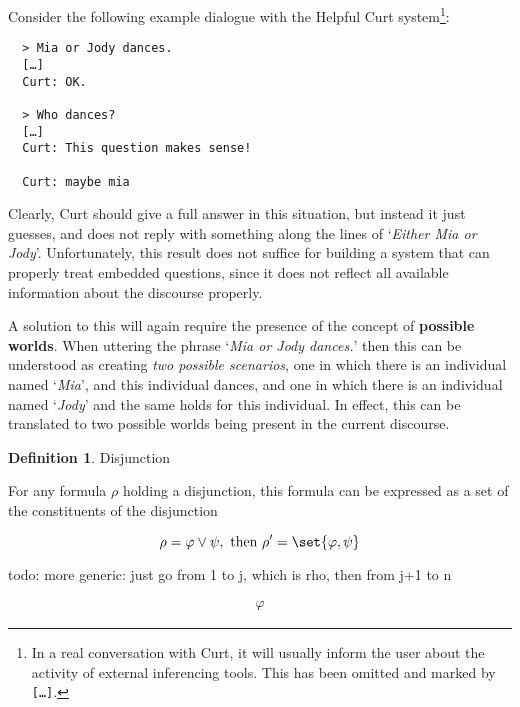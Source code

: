 \documentclass[a4paper]{article}
\newcommand{\term}[1]{\textsf{\textbf{#1}}} %
\newcommand{\code}[1]{\texttt{#1}} %
\newcommand{\pn}{\textsf} %
\newcommand{\example}[1]{`\textit{#1}'} %
\newcommand{\curt}{\pn{Curt}}
\theoremstyle{remark}
\theoremstyle{remark}
\theoremstyle{definition}
\newtheorem{definition}[thm]{Definition}
\theoremstyle{definition}
\begin{document}
Consider the following example dialogue with the \pn{Helpful Curt}
system\footnote{In a real conversation with \curt, it will usually inform the
user about the activity of external inferencing tools. This has been omitted and
marked by \code{[…]}.}:

\begin{verbatim}
  > Mia or Jody dances.
  […]
  Curt: OK.

  > Who dances?
  […]
  Curt: This question makes sense!

  Curt: maybe mia
\end{verbatim}

Clearly, \curt{} should give a full answer in this situation, but instead it
just guesses, and does not reply with something along the lines of \example{Either
Mia or Jody}. Unfortunately, this result does not suffice for building a system
that can properly treat embedded questions, since it does not reflect all
available information about the discourse properly.

A solution to this will again require the presence of the concept of
\term{possible worlds}. When uttering the phrase \example{Mia or Jody dances.}
then this can be understood as creating \emph{two possible scenarios}, one in
which there is an individual named \example{Mia}, and this individual dances,
and one in which there is an individual named \example{Jody} and the same holds
for this individual. In effect, this can be translated to two possible worlds
being present in the current discourse.

\begin{definition}
  Disjunction

  For any formula $\rho$ holding a disjunction, this formula can be expressed as a set
  of the constituents of the disjunction

  \[ \rho = \varphi \vee \psi, \textrm{ then } \rho' = \set{\varphi, \psi}\]


  todo: more generic: just go from 1 to j, which is rho, then from j+1 to n

  \begin{eqnarray*}
    \varphi
  \end{eqnarray*}
\end{definition}
\end{document}
